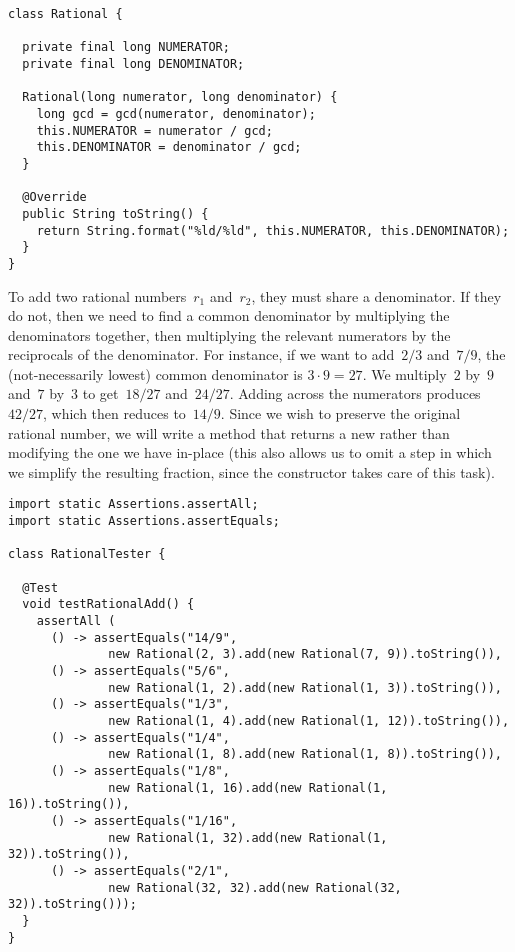 \begin{lstlisting}[language=MyJava]
class Rational {
  
  private final long NUMERATOR;
  private final long DENOMINATOR;

  Rational(long numerator, long denominator) {
    long gcd = gcd(numerator, denominator);
    this.NUMERATOR = numerator / gcd;
    this.DENOMINATOR = denominator / gcd; 
  }

  @Override
  public String toString() {
    return String.format("%ld/%ld", this.NUMERATOR, this.DENOMINATOR);
  }
}
\end{lstlisting}

To add two rational numbers~$r_1$ and~$r_2$, they must share a denominator. 
If they do not, then we need to find a common denominator by multiplying the denominators together, then multiplying the relevant numerators by the reciprocals of the denominator. 
For instance, if we want to add~$2/3$ and~$7/9$, the (not-necessarily lowest) common denominator is $3\cdot{9} = 27$. 
We multiply~$2$ by~$9$ and~$7$ by~$3$ to get~$18/27$ and~$24/27$. 
Adding across the numerators produces~$42/27$, which then reduces to~$14/9$. 
Since we wish to preserve the original rational number, we will write a method that returns a new  rather than modifying the one we have in-place (this also allows us to omit a step in which we simplify the resulting fraction, since the constructor takes care of this task).

\begin{lstlisting}[language=MyJava]
import static Assertions.assertAll;
import static Assertions.assertEquals;

class RationalTester {

  @Test
  void testRationalAdd() {
    assertAll (
      () -> assertEquals("14/9", 
              new Rational(2, 3).add(new Rational(7, 9)).toString()),
      () -> assertEquals("5/6", 
              new Rational(1, 2).add(new Rational(1, 3)).toString()),
      () -> assertEquals("1/3", 
              new Rational(1, 4).add(new Rational(1, 12)).toString()),
      () -> assertEquals("1/4", 
              new Rational(1, 8).add(new Rational(1, 8)).toString()),
      () -> assertEquals("1/8", 
              new Rational(1, 16).add(new Rational(1, 16)).toString()),
      () -> assertEquals("1/16", 
              new Rational(1, 32).add(new Rational(1, 32)).toString()),
      () -> assertEquals("2/1", 
              new Rational(32, 32).add(new Rational(32, 32)).toString()));
  }
}
\end{lstlisting}

